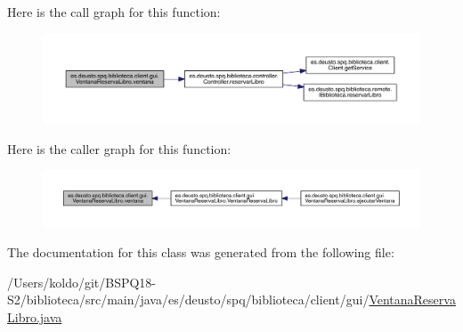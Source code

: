 Here is the call graph for this function\+:
\nopagebreak
\begin{figure}[H]
\begin{center}
\leavevmode
\includegraphics[width=350pt]{classes_1_1deusto_1_1spq_1_1biblioteca_1_1client_1_1gui_1_1_ventana_reserva_libro_a91e2a0b1beb4353db52c2b3b8d8a8d1a_cgraph}
\end{center}
\end{figure}
Here is the caller graph for this function\+:
\nopagebreak
\begin{figure}[H]
\begin{center}
\leavevmode
\includegraphics[width=350pt]{classes_1_1deusto_1_1spq_1_1biblioteca_1_1client_1_1gui_1_1_ventana_reserva_libro_a91e2a0b1beb4353db52c2b3b8d8a8d1a_icgraph}
\end{center}
\end{figure}


The documentation for this class was generated from the following file\+:\begin{DoxyCompactItemize}
\item 
/\+Users/koldo/git/\+B\+S\+P\+Q18-\/\+S2/biblioteca/src/main/java/es/deusto/spq/biblioteca/client/gui/\mbox{\hyperlink{_ventana_reserva_libro_8java}{Ventana\+Reserva\+Libro.\+java}}\end{DoxyCompactItemize}
